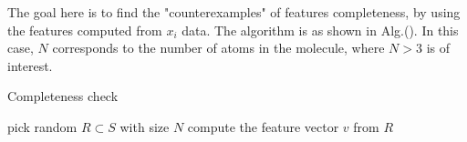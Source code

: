 \documentclass[12pt]{article}
\begin{document}
The goal here is to find the "counterexamples" of features completeness, by using the features computed from $x_i$ data. 
The algorithm is as shown in Alg.(). In this case, $N$ corresponds to the number of atoms in the molecule, where $N > 3$ is of interest.


\begin{algorithm}
    \caption{Completeness check}
    \label{alg:completeness_check}
    \begin{algorithmic}[1]
        \State pick random $R \subset S$ with size $N$
        \State compute the feature vector $v$ from $R$
        \EndIf
        \EndFor
    \end{algorithmic}
\end{algorithm}
\end{document}
